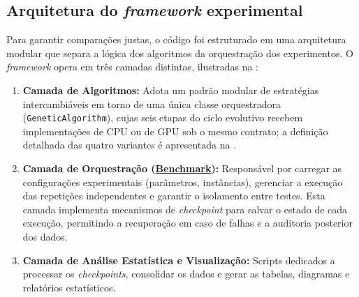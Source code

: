 \subsection{Arquitetura do \emph{framework} experimental}\label{sec-313-arquitetura-framework}

Para garantir comparações justas, o código foi estruturado em uma arquitetura modular que separa a lógica dos algoritmos da orquestração dos experimentos.
O \emph{framework} opera em três camadas distintas, ilustradas na :

\begin{enumerate}
      \item
            \textbf{Camada de Algoritmos:} Adota um padrão modular de estratégias intercambiáveis em torno de uma única classe orquestradora (\texttt{GeneticAlgorithm}), cujas seis etapas do ciclo evolutivo recebem implementações de CPU ou de GPU sob o mesmo contrato; a definição detalhada das quatro variantes é apresentada na .
      \item
            \textbf{Camada de Orquestração (\hyperlink{term:benchmark}{Benchmark}):} Responsável por carregar as configurações experimentais (parâmetros, instâncias), gerenciar a execução das repetições independentes e garantir o isolamento entre testes.
            Esta camada implementa mecanismos de \emph{checkpoint} para salvar o estado de cada execução, permitindo a recuperação em caso de falhas e a auditoria posterior dos dados.
      \item
            \textbf{Camada de Análise Estatística e Visualização:} Scripts dedicados a processar os \emph{checkpoints}, consolidar os dados e gerar as tabelas, diagramas e relatórios estatísticos.
\end{enumerate}

